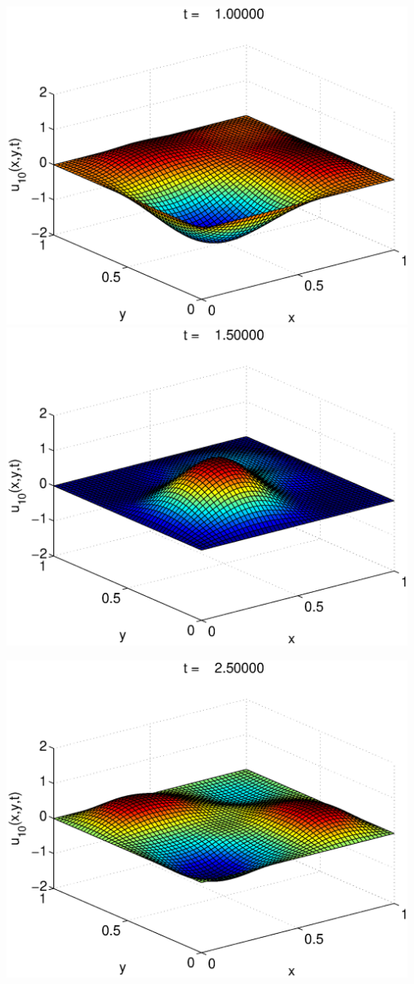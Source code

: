 \begin{solution}
\begin{enumerate}
\begin{center}
\includegraphics[scale=0.37]{wave2d_3} \quad
\includegraphics[scale=0.37]{wave2d_4} 

\includegraphics[scale=0.37]{wave2d_5} 
\end{center}


\end{enumerate}
\end{solution}
